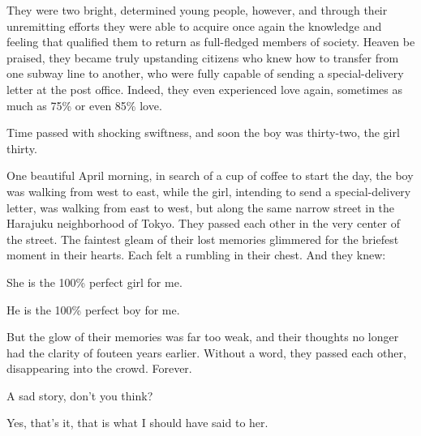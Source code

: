 \documentclass[10pt,a4paper]{article}
\begin{document}
They were two bright, determined young people, however, and through their unremitting efforts they were able to acquire once again the knowledge and feeling that qualified them to return as full-fledged members of society. Heaven be praised, they became truly upstanding citizens who knew how to transfer from one subway line to another, who were fully capable of sending a special-delivery letter at the post office. Indeed, they even experienced love again, sometimes as much as 75\% or even 85\% love.

Time passed with shocking swiftness, and soon the boy was thirty-two, the girl thirty.

One beautiful April morning, in search of a cup of coffee to start the day, the boy was walking from west to east, while the girl, intending to send a special-delivery letter, was walking from east to west, but along the same narrow street in the Harajuku neighborhood of Tokyo. They passed each other in the very center of the street. The faintest gleam of their lost memories glimmered for the briefest moment in their hearts. Each felt a rumbling in their chest. And they knew:

She is the 100\% perfect girl for me.

He is the 100\% perfect boy for me.

But the glow of their memories was far too weak, and their thoughts no longer had the clarity of fouteen years earlier. Without a word, they passed each other, disappearing into the crowd. Forever.

A sad story, don’t you think?

Yes, that’s it, that is what I should have said to her.
\end{document}
